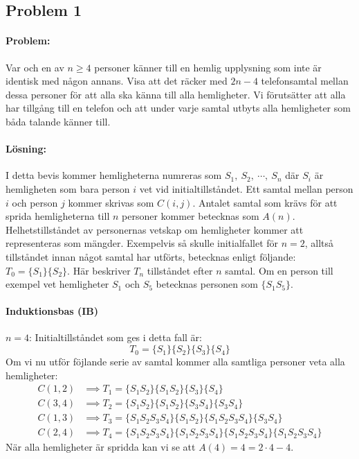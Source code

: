 \subsection*{Problem 1}

\paragraph{Problem:} Var och en av $n\ge 4$ personer känner till en hemlig upplysning som inte är identisk med någon annans. Visa att det räcker med $2n-4$ telefonsamtal mellan dessa personer för att alla ska känna till alla hemligheter. Vi förutsätter att alla har tillgång till en telefon och att under varje samtal utbyts alla hemligheter som båda talande känner till.

\paragraph{Lösning:} I detta bevis kommer hemligheterna numreras som $S_1,\ S_2, \ \cdots ,\ S_n$ där $S_i$ är hemligheten som bara person $i$ vet vid initialtillståndet. Ett samtal mellan person $i$ och person $j$ kommer skrivas som $C(i,j)$. Antalet samtal som krävs för att sprida hemligheterna till $n$ personer kommer betecknas som $A(n)$. Helhetstillståndet av personernas vetskap om hemligheter kommer att representeras som mängder. Exempelvis så skulle initialfallet för $n=2$, alltså tillståndet innan något samtal har utförts, betecknas enligt följande: $T_0=\{S_1\}\{S_2\}$. Här beskriver $T_n$ tillståndet efter $n$ samtal. Om en person till exempel vet hemligheter $S_1$ och $S_5$ betecknas personen som $\{S_1S_5\}$.

\paragraph{Induktionsbas (IB)} $n=4$:
Initialtillståndet som ges i detta fall är:
\[T_0=\{S_1\}\{S_2\}\{S_3\}\{S_4\}\]
Om vi nu utför föjlande serie av samtal kommer alla samtliga personer veta alla hemligheter:
\begin{align*}
C(1,2) &\implies T_1=\{S_1S_2\}\{S_1S_2\}\{S_3\}\{S_4\} \\[5pt]
C(3,4) &\implies T_2=\{S_1S_2\}\{S_1S_2\}\{S_3S_4\}\{S_3S_4\} \\[5pt]
C(1,3) &\implies T_3=\{S_1S_2S_3S_4\}\{S_1S_2\}\{S_1S_2S_3S_4\}\{S_3S_4\} \\[5pt]
C(2,4) &\implies T_4=\{S_1S_2S_3S_4\}\{S_1S_2S_3S_4\}\{S_1S_2S_3S_4\}\{S_1S_2S_3S_4\}
\end{align*}
När alla hemligheter är spridda kan vi se att $A(4)=4=2\cdot 4-4$.

